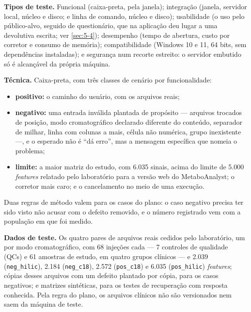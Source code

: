 \textbf{Tipos de teste.} Funcional (caixa-preta, pela janela); integração (janela, servidor local, núcleo e disco; e linha de comando, núcleo e disco); usabilidade (o uso pelo público-alvo, seguido de questionário, que na aplicação deu lugar a uma devolutiva escrita; ver \ref{sec:5-4}); desempenho (tempo de abertura, custo por corretor e consumo de memória); compatibilidade (Windows 10 e 11, 64 bits, sem dependências instaladas); e segurança num recorte estreito: o servidor embutido só é alcançável da própria máquina.

\textbf{Técnica.} Caixa-preta, com três classes de cenário por funcionalidade:

\begin{itemize}
\item \textbf{positivo:} o caminho do usuário, com os arquivos reais;
\item \textbf{negativo:} uma entrada inválida plantada de propósito --- arquivos trocados de posição, modo cromatográfico declarado diferente do conteúdo, separador de milhar, linha com colunas a mais, célula não numérica, grupo inexistente ---, e o esperado não é ``dá erro'', mas a mensagem específica que nomeia o problema;
\item \textbf{limite:} a maior matriz do estudo, com 6.035 sinais, acima do limite de 5.000 \textit{features} relatado pelo laboratório para a versão web do MetaboAnalyst; o corretor mais caro; e o cancelamento no meio de uma execução.
\end{itemize}

Duas regras de método valem para os casos do plano: o caso negativo precisa ter sido visto não acusar com o defeito removido, e o número registrado vem com a população em que foi medido.


\textbf{Dados de teste.} Os quatro pares de arquivos reais cedidos pelo laboratório, um por modo cromatográfico, com 68 injeções cada --- 7 controles de qualidade (QCs) e 61 amostras de estudo, em quatro grupos clínicos --- e 2.039 (\texttt{neg\_\allowbreak{}hilic}), 2.184 (\texttt{neg\_\allowbreak{}c18}), 2.572 (\texttt{pos\_\allowbreak{}c18}) e 6.035 (\texttt{pos\_\allowbreak{}hilic}) \textit{features}; cópias desses arquivos com um defeito plantado por cópia, para os casos negativos; e matrizes sintéticas, para os testes de recuperação com resposta conhecida. Pela regra do plano, os arquivos clínicos não são versionados nem saem da máquina de teste.

